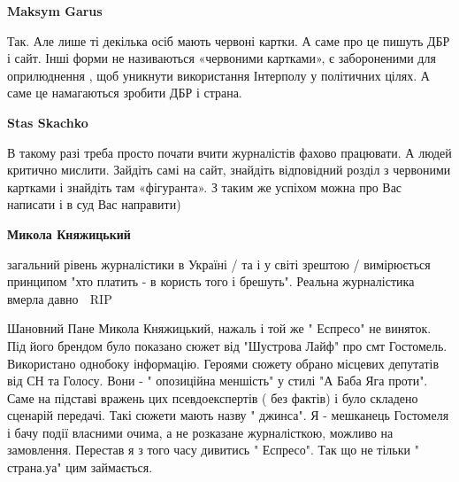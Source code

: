 \begin{itemize}
\begin{itemize}
\textbf{Maksym Garus} 

Так. Але лише ті декілька осіб мають червоні картки. А саме про це пишуть ДБР і
сайт. Інші форми не називаються «червоними картками», є забороненими для
оприлюднення , щоб уникнути використання Інтерполу у політичних цілях. А саме
це намагаються зробити ДБР і страна.



 
\textbf{Stas Skachko} 

В такому разі треба просто почати вчити журналістів фахово працювати. А людей
критично мислити. Зайдіть самі на сайт, знайдіть відповідний розділ з червоними
картками і знайдіть там «фігуранта». З таким же успіхом можна про Вас написати
і в суд Вас направити)


 
\textbf{Микола Княжицький} 

загальний рівень журналістики в Україні / та і у світі зрештою / вимірюється
принципом "хто платить - в користь того і брешуть". Реальна журналістика вмерла
давно 🙁 RIP
\end{itemize}

 

Шановний Пане Микола Княжицький, нажаль і той же " Еспресо" не виняток. Під
його брендом було показано сюжет від "Шустрова Лайф" про смт Гостомель.
Використано однобоку інформацію. Героями сюжету обрано місцевих депутатів від
СН та Голосу. Вони - " опозиційна меншість" у стилі "А Баба Яга проти". Саме на
підставі вражень цих псевдоекспертів ( без фактів) і було складено сценарій
передачі. Такі сюжети мають назву " джинса". Я - мешканець Гостомеля і бачу
події власними очима, а не розказане журналісткою, можливо на замовлення.
Перестав я з того часу дивитись " Еспресо". Так що не тільки " страна.уа" цим
займається.



\end{itemize}
